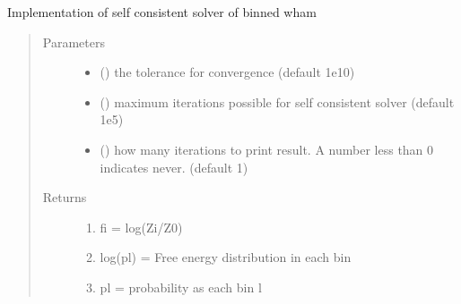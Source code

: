 \documentclass[letterpaper,10pt,english]{sphinxmanual}
\begin{document}
\begin{fulllineitems}
\begin{fulllineitems}
\label{\detokenize{wham:wham.Bwham.Bwham.self_consistent}}
Implementation of self consistent solver of binned wham
\begin{quote}\begin{description}
\item[{Parameters}] \leavevmode\begin{itemize}
\item {} 
 () \textendash{} the tolerance for convergence  (default 1e\sphinxhyphen{}10)

\item {} 
 () \textendash{} maximum iterations possible for self consistent solver (default 1e5)

\item {} 
 () \textendash{} how many iterations to print result. A number less than 0 indicates never. (default \sphinxhyphen{}1)

\end{itemize}

\item[{Returns}] \leavevmode
\begin{enumerate}
%
\item {} 
fi = \sphinxhyphen{}log(Zi/Z0)

\item {} 
\sphinxhyphen{}log(pl) = Free energy distribution in each bin

\item {} 
pl = probability as each bin l

\end{enumerate}


\end{description}\end{quote}

\end{fulllineitems}



\end{fulllineitems}
\end{document}
